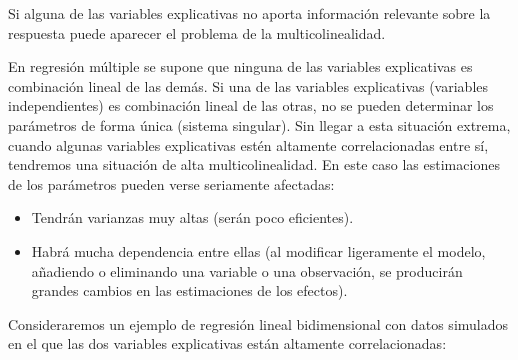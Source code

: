\documentclass[
]{book}
\theoremstyle{break}
\theoremstyle{definition}
\theoremstyle{definition}
\theoremstyle{definition}
\theoremstyle{remark}
\begin{document}
Si alguna de las variables explicativas no aporta información relevante sobre la respuesta puede aparecer el problema de la multicolinealidad.

En regresión múltiple se supone que ninguna de las variables explicativas es combinación lineal de las demás.
Si una de las variables explicativas (variables independientes) es combinación lineal de las otras, no se pueden determinar los parámetros de forma única (sistema singular).
Sin llegar a esta situación extrema, cuando algunas variables explicativas estén altamente correlacionadas entre sí, tendremos una situación de alta multicolinealidad.
En este caso las estimaciones de los parámetros pueden verse seriamente afectadas:

\begin{itemize}
\item
  Tendrán varianzas muy altas (serán poco eficientes).
\item
  Habrá mucha dependencia entre ellas (al modificar ligeramente el
  modelo, añadiendo o eliminando una variable o una observación,
  se producirán grandes cambios en las estimaciones de los efectos).
\end{itemize}

Consideraremos un ejemplo de regresión lineal bidimensional con datos simulados en el que las dos variables explicativas están altamente correlacionadas:
\end{document}
